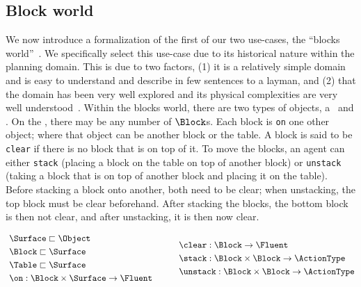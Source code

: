 \subsection{Block world}

We now introduce a formalization of the first of our two use-cases, the
``blocks world''~\cite{nilsson_principles_1982}. We specifically select
this use-case due to its historical nature within the planning domain.
This is due to two factors, (1) it is a relatively simple domain and is
easy to understand and describe in few sentences to a layman, and
(2) that the domain has been very well explored and its physical
complexities are very well
understood~\cite{gupta_complexity_1992,slaney_blocks_2001}. Within the
blocks world, there are two types of objects, a \Table\ and \Block.
On the \Table, there may be any number of $\Block$s.  Each block is
\texttt{on} one other object; where that object can be another block or the
table. A block is said to be \texttt{clear} if there is no block that
is on top of it. To move the blocks, an agent can either
\texttt{stack} (placing a block on the table on top of another block)
or \texttt{unstack} (taking a block that is on top of another block
and placing it on the table). Before stacking a block onto another, both need
to be clear; when unstacking, the top block must be clear beforehand.
After stacking the blocks, the bottom block is then not clear, and
after unstacking, it is then now clear.

\vspace{-0.03in}
  \begin{equation*}
    \begin{aligned}\
      &\Surface \sqsubset \Object \\
      &\Block \sqsubset \Surface \\
      &\Table \sqsubset \Surface \\
      &\on: \Block \times \Surface \rightarrow \Fluent
             \end{aligned} \hspace{30pt}
 \begin{aligned}
      &\clear: \Block \rightarrow \Fluent \\
      &\stack: \Block \times \Block \rightarrow \ActionType \\
      &\unstack: \Block \times \Block \rightarrow \ActionType
    \end{aligned}
  \end{equation*}
